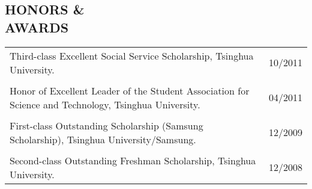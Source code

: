 \documentclass[margin]{res} %
\begin{document}
\begin{resume}
        \section{HONORS \& \\ AWARDS}
        \begin{tabular}{L{10cm}R{2.1cm}}
            Third-class Excellent Social Service Scholarship, Tsinghua
            University. & 10/2011 \\
            \vspace{1pt} \\%
            Honor of Excellent Leader of the Student Association for Science
            and Technology, Tsinghua University. & 04/2011 \\
            \vspace{1pt} \\%
            First-class Outstanding Scholarship (Samsung Scholarship),
            Tsinghua University/Samsung. & 12/2009 \\
            \vspace{1pt} \\%
            Second-class Outstanding Freshman Scholarship, Tsinghua University.
            & 12/2008
        \end{tabular}
        
    \end{resume}
\end{document}
